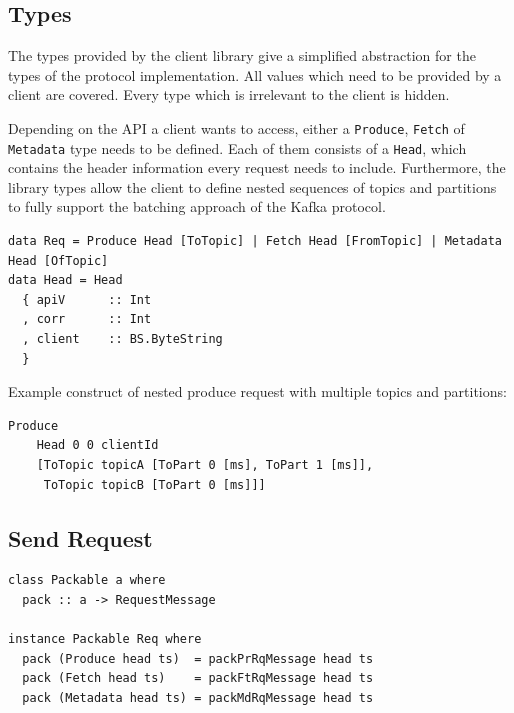 \subsection{Types}
The types provided by the client library give a simplified abstraction for
the types of the protocol implementation. All values which need to be
provided by a client are covered. Every type which is irrelevant to the client
is hidden.

Depending on the API a client wants to access, either a \lstinline{Produce},
\lstinline{Fetch} of \lstinline{Metadata} type needs to be defined. Each of them consists
of a \lstinline{Head}, which contains the header information every request needs
to include. Furthermore, the library types allow the client to define nested
sequences of topics and partitions to fully support the batching approach of the
Kafka protocol. 

\begin{lstlisting}[caption={Simplified types for client API}]
data Req = Produce Head [ToTopic] | Fetch Head [FromTopic] | Metadata Head [OfTopic]
data Head = Head
  { apiV      :: Int
  , corr      :: Int
  , client    :: BS.ByteString
  }
\end{lstlisting}

Example construct of nested produce request with multiple topics and partitions:
\begin{verbatim}
Produce 
    Head 0 0 clientId
    [ToTopic topicA [ToPart 0 [ms], ToPart 1 [ms]],
     ToTopic topicB [ToPart 0 [ms]]]

\end{verbatim}


\subsection{Send Request}

\begin{lstlisting}
class Packable a where
  pack :: a -> RequestMessage

instance Packable Req where
  pack (Produce head ts)  = packPrRqMessage head ts
  pack (Fetch head ts)    = packFtRqMessage head ts
  pack (Metadata head ts) = packMdRqMessage head ts
\end{lstlisting}

